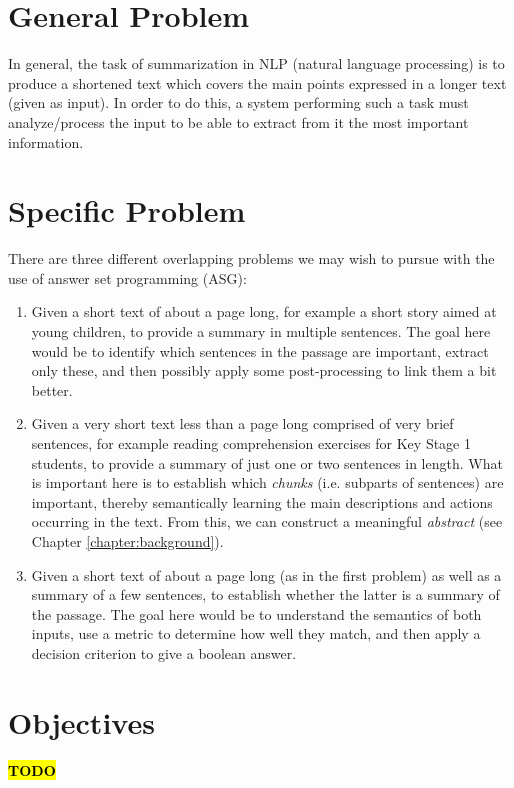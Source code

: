 \label{chapter:introduction}

\section{General Problem}

In general, the task of summarization in NLP (natural language processing) is to produce a shortened text which covers the main points expressed in a longer text (given as input). In order to do this, a system performing such a task must analyze/process the input to be able to extract from it the most important information.

\section{Specific Problem}

There are three different overlapping problems we may wish to pursue with the use of answer set programming (ASG):

\begin{enumerate}
\item Given a short text of about a page long, for example a short story aimed at young children, to provide a summary in multiple sentences. The goal here would be to identify which sentences in the passage are important, extract only these, and then possibly apply some post-processing to link them a bit better.
\item Given a very short text less than a page long comprised of very brief sentences, for example reading comprehension exercises for Key Stage 1 students, to provide a summary of just one or two sentences in length. What is important here is to establish which \textit{chunks} (i.e. subparts of sentences)  are important, thereby semantically learning the main descriptions and actions occurring in the text. From this, we can construct a meaningful \textit{abstract} (see Chapter \ref{chapter:background}).
\item Given a short text of about a page long (as in the first problem) as well as a summary of a few sentences, to establish whether the latter is a summary of the passage. The goal here would be to understand the semantics of both inputs, use a metric to determine how well they match, and then apply a decision criterion to give a boolean answer.
\end{enumerate}

\section{Objectives}

\textcolor{red}{\textbf{\hl{TODO}}}